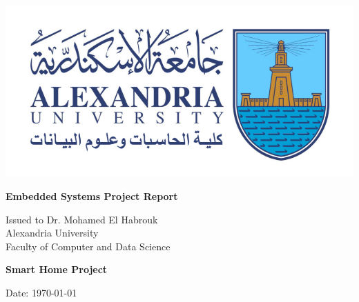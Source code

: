 \documentclass{article}
\begin{document}
\begin{titlepage}
    \begin{center}
        \includegraphics[width=\textwidth]{figs/logo.jpg} %
        \vspace{1cm}
        
        \Huge{\textbf{Embedded Systems Project Report}}
        
        \vspace{1.5cm}
        \Large{Issued to Dr. Mohamed El Habrouk\\
        Alexandria University\\
        Faculty of Computer and Data Science}
        
        \vspace{2.5cm}
        \begin{tcolorbox}[colframe=blue!50!black, colback=blue!5, sharp corners]
            \begin{center}
                \LARGE{\textbf{Smart Home Project}}
            \end{center}
        \end{tcolorbox}
        
        \vfill
        
        \Large{Date: \today}
    \end{center}
\end{titlepage}

\newpage


\newpage
\tableofcontents

\newpage


\newpage


\newpage


\end{document}
